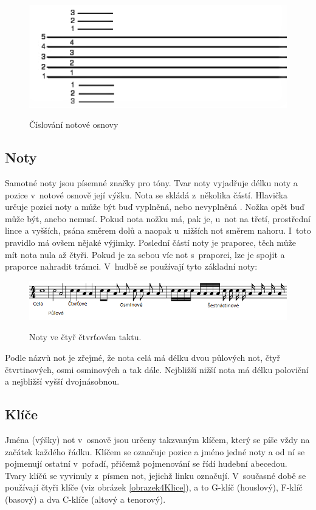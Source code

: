 \begin{figure}[h]\centering
    \centering
    \includegraphics[width=0.5\linewidth]{obrazky/notovaOsnova.png}\\[1pt]  
    \caption{Číslování notové osnovy}    
    \label{obrazekNotovaOsnova}
\end{figure}

\subsection{Noty}
Samotné noty jsou písemné značky pro tóny.
Tvar noty vyjadřuje délku noty a pozice v~notové osnově její výšku.
Nota se skládá z~několika částí.
Hlavička určuje pozici noty a může být buď vyplněná, nebo nevyplněná . 
Nožka opět buď může být, anebo nemusí. 
Pokud nota nožku má, pak je, u~not na třetí, prostřední lince a vyšších, psána směrem dolů a naopak u~nižších not směrem nahoru.
I~toto pravidlo má ovšem nějaké výjimky.
Poslední částí noty je praporec, těch může mít nota nula až čtyři.
Pokud je za sebou víc not s~praporci, lze je spojit a praporce nahradit trámci.
V~hudbě se používají tyto základní noty:

\begin{figure}[h]\centering
    \centering
    \includegraphics[width=0.8\linewidth]{obrazky/druhyNot.png}\\[1pt]  
    \caption{Noty ve čtyř čtvrťovém taktu.}    
    \label{obrazekNoty}
\end{figure}

Podle názvů not je zřejmé, že nota celá má délku dvou půlových not, 
čtyř čtvrtinových, osmi osminových a tak dále.
Nejbližší nižší nota má délku poloviční a nejbližší vyšší dvojnásobnou.
\par

\subsection{Klíče}
Jména (výšky) not v~osnově jsou určeny takzvaným klíčem, 
který se píše vždy na začátek každého řádku.
Klíčem se označuje pozice a jméno jedné noty 
a od ní se pojmenují ostatní v~pořadí, 
přičemž pojmenování se řídí hudební abecedou.
Tvary klíčů se vyvinuly z~písmen not, jejichž linku označují.
V~současné době se používají čtyři klíče (viz obrázek \ref{obrazek4Klice}), 
a to G-klíč (houslový), F-klíč (basový) a dva C-klíče (altový a tenorový).


